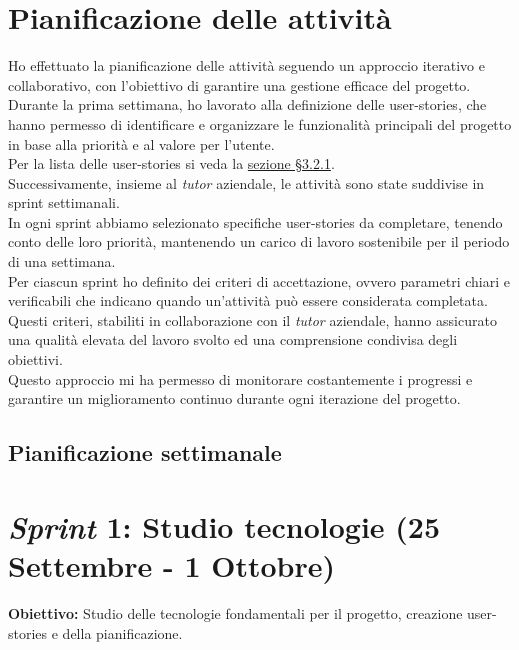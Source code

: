 \section{Pianificazione delle attività}
\label{sez:pianificazione-attivita}

Ho effettuato la pianificazione delle attività seguendo un approccio iterativo e collaborativo, con l'obiettivo di garantire una gestione efficace del progetto.\\
Durante la prima settimana, ho lavorato alla definizione delle \gls{user-stories}, che hanno permesso di identificare e organizzare le funzionalità principali del progetto in base alla priorità e al valore per l’utente.\\
Per la lista delle \gls{user-stories} si veda la {\hyperref[subsubsec:epic-stories]{sezione §3.2.1}}.\\

\noindent Successivamente, insieme al \textit{tutor} aziendale, le attività sono state suddivise in \gls{sprint} settimanali.\\
In ogni \gls{sprint} abbiamo selezionato specifiche \gls{user-stories} da completare, tenendo conto delle loro priorità, mantenendo un carico di lavoro sostenibile per il periodo di una settimana. \\
Per ciascun \gls{sprint} ho definito dei criteri di accettazione, ovvero parametri chiari e verificabili che indicano quando un'attività può essere considerata completata. \\
Questi criteri, stabiliti in collaborazione con il \textit{tutor} aziendale, hanno assicurato una qualità elevata del lavoro svolto ed una comprensione condivisa degli obiettivi. \\
Questo approccio mi ha permesso di monitorare costantemente i progressi e garantire un miglioramento continuo durante ogni iterazione del progetto.


\pagebreak
\subsection{Pianificazione settimanale}
\label{sez:pianificazione-settimanale}

\section*{\textit{Sprint} 1: Studio tecnologie (25 Settembre - 1 Ottobre)}
\textbf{Obiettivo:} Studio delle tecnologie fondamentali per il progetto, creazione \gls{user-stories} e della pianificazione.\\  


